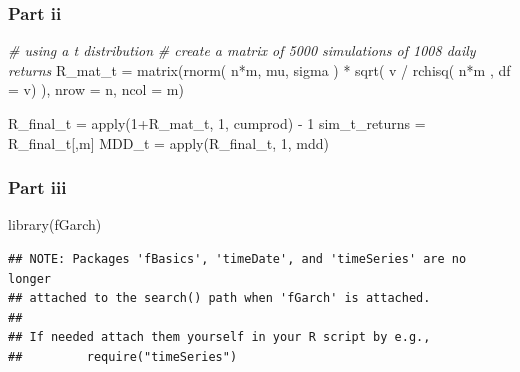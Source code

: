\documentclass[
  oneside]{book}
\newenvironment{Shaded}{\begin{snugshade}}{\end{snugshade}}
\newcommand{\AttributeTok}[1]{\textcolor[rgb]{0.77,0.63,0.00}{#1}}
\newcommand{\CommentTok}[1]{\textcolor[rgb]{0.56,0.35,0.01}{\textit{#1}}}
\newcommand{\DecValTok}[1]{\textcolor[rgb]{0.00,0.00,0.81}{#1}}
\newcommand{\FunctionTok}[1]{\textcolor[rgb]{0.00,0.00,0.00}{#1}}
\newcommand{\NormalTok}[1]{#1}
\newcommand{\OtherTok}[1]{\textcolor[rgb]{0.56,0.35,0.01}{#1}}
\newcommand{\SpecialCharTok}[1]{\textcolor[rgb]{0.00,0.00,0.00}{#1}}
\begin{document}
\hypertarget{part-ii}{%
\subsubsection{Part ii}\label{part-ii}}

\begin{Shaded}
\begin{Highlighting}[]
\CommentTok{\# using a t distribution}
\CommentTok{\# create a matrix of 5000 simulations of 1008 daily returns}
\NormalTok{R\_mat\_t }\OtherTok{=} \FunctionTok{matrix}\NormalTok{(}\FunctionTok{rnorm}\NormalTok{( n}\SpecialCharTok{*}\NormalTok{m, mu, sigma ) }\SpecialCharTok{*} \FunctionTok{sqrt}\NormalTok{( v }\SpecialCharTok{/} \FunctionTok{rchisq}\NormalTok{( n}\SpecialCharTok{*}\NormalTok{m , }\AttributeTok{df =}\NormalTok{ v) ), }\AttributeTok{nrow =}\NormalTok{ n, }\AttributeTok{ncol =}\NormalTok{ m)}

\NormalTok{R\_final\_t }\OtherTok{=} \FunctionTok{apply}\NormalTok{(}\DecValTok{1}\SpecialCharTok{+}\NormalTok{R\_mat\_t, }\DecValTok{1}\NormalTok{, cumprod) }\SpecialCharTok{{-}} \DecValTok{1}
\NormalTok{sim\_t\_returns }\OtherTok{=}\NormalTok{ R\_final\_t[,m]}
\NormalTok{MDD\_t }\OtherTok{=} \FunctionTok{apply}\NormalTok{(R\_final\_t, }\DecValTok{1}\NormalTok{, mdd)}
\end{Highlighting}
\end{Shaded}

\hypertarget{part-iii}{%
\subsubsection{Part iii}\label{part-iii}}

\begin{Shaded}
\begin{Highlighting}[]
\FunctionTok{library}\NormalTok{(fGarch)}
\end{Highlighting}
\end{Shaded}

\begin{verbatim}
## NOTE: Packages 'fBasics', 'timeDate', and 'timeSeries' are no longer
## attached to the search() path when 'fGarch' is attached.
## 
## If needed attach them yourself in your R script by e.g.,
##         require("timeSeries")
\end{verbatim}
\end{document}
